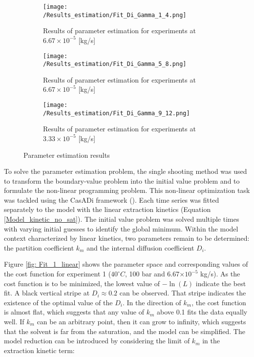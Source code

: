\documentclass[../Supercritical_fluid_extraction_of_essential_oil_from_chamomile.tex]{subfiles}
\begin{document}
	
	\label{CH: Results}
	
	\begin{figure*}[!h]
		\centering
		\begin{subfigure}{0.3\textwidth}
			\centering
			\texttt{[image: /Results\_estimation/Fit\_Di\_Gamma\_1\_4.png]}
			\caption{Results of parameter estimation for experiments at $6.67\times 10^{-5}$ [kg/s]}%
			\label{fig: Fit_1_4_Di_Gamma}
		\end{subfigure}
		\hfill
		\begin{subfigure}{0.3\textwidth}
			\centering
			\texttt{[image: /Results\_estimation/Fit\_Di\_Gamma\_5\_8.png]}
			\caption{Results of parameter estimation for experiments at $6.67\times 10^{-5}$ [kg/s]}%
			\label{fig: Fit_5_8_Di_Gamma}
		\end{subfigure}
		\hfill
		\begin{subfigure}{0.3\textwidth}
			\centering
			\texttt{[image: /Results\_estimation/Fit\_Di\_Gamma\_9\_12.png]}
			\caption{Results of parameter estimation for experiments at $3.33\times 10^{-5}$ [kg/s]}
			\label{fig: Fit_9_12_Di_Gamma}
		\end{subfigure}
		\caption{Parameter estimation results}
		\label{fig: Fit_Di_Gamma}
	\end{figure*}
	
	To solve the parameter estimation problem, the single shooting method was used to transform the boundary-value problem into the initial value problem and to formulate the non-linear programming problem. This non-linear optimization task was tackled using the CasADi framework (\citet{Andersson2018}). Each time series was fitted separately to the model with the linear extraction kinetics (Equation \ref{Model_kinetic_no_sat}). The initial value problem was solved multiple times with varying initial guesses to identify the global minimum. Within the model context characterized by linear kinetics, two parameters remain to be determined: the partition coefficient $k_m$ and the internal diffusion coefficient $D_i$. 
		
	Figure \ref{fig: Fit_1_linear} shows the parameter space and corresponding values of the cost function for experiment 1 ($40^\circ C$, 100 bar and 6.67$\times 10^{-5}$ kg/s). As the cost function is to be minimized, the lowest value of $-\ln(L)$ indicate the best fit. A black vertical stripe at $D_i \approx 0.2$ can be observed. That stripe indicates the existence of the optimal value of the $D_i$. In the direction of $k_m$, the cost function is almost flat, which suggests that any value of $k_m$ above 0.1 fits the data equally well. If $k_m$ can be an arbitrary point, then it can grow to infinity, which suggests that the solvent is far from the saturation, and the model can be simplified. The model reduction can be introduced by considering the limit of $k_m$ in the extraction kinetic term: 
	
\end{document}

